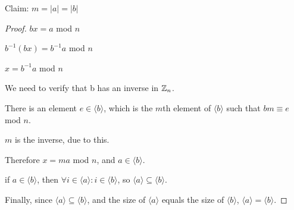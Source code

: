 
\begin{question}{2}

Claim: $m=|a|=|b|$

\begin{proof}

$bx = a$ mod $n$

$b^{-1}(bx) = b^{-1}a$ mod $n$

$x = b^{-1}a$ mod $n$

We need to verify that b has an inverse in $\mathbb{Z}_n$.

There is an element $e \in  \langle b \rangle$, which is the $m$th element of $ \langle b \rangle$ such that $bm \equiv e $ mod $n$.

$m$ is the inverse, due to this. 

Therefore $x = ma$ mod $n$, and $a \in  \langle b \rangle$.

if $a \in  \langle b \rangle$, then $\forall i \in  \langle a \rangle : i \in  \langle b \rangle$, so $ \langle a \rangle \subseteq  \langle b \rangle$.

Finally, since $ \langle a \rangle \subseteq  \langle b \rangle$, and the size of $ \langle a \rangle$ equals the size of $ \langle b \rangle$, $ \langle a \rangle =  \langle b \rangle$.  

\end{proof}
\end{question}

